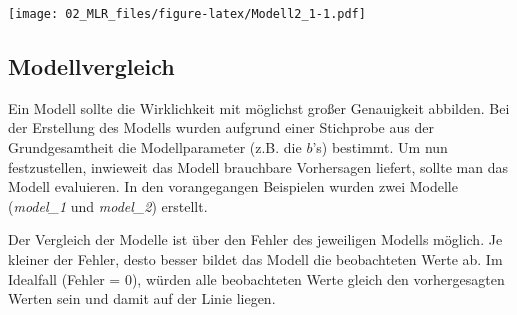 \documentclass[]{article}
\newenvironment{Shaded}{\begin{snugshade}}{\end{snugshade}}
\newcommand{\CommentTok}[1]{\textcolor[rgb]{0.56,0.35,0.01}{\textit{#1}}}
\newcommand{\DataTypeTok}[1]{\textcolor[rgb]{0.13,0.29,0.53}{#1}}
\newcommand{\DecValTok}[1]{\textcolor[rgb]{0.00,0.00,0.81}{#1}}
\newcommand{\KeywordTok}[1]{\textcolor[rgb]{0.13,0.29,0.53}{\textbf{#1}}}
\newcommand{\NormalTok}[1]{#1}
\newcommand{\OperatorTok}[1]{\textcolor[rgb]{0.81,0.36,0.00}{\textbf{#1}}}
\newcommand{\StringTok}[1]{\textcolor[rgb]{0.31,0.60,0.02}{#1}}
\begin{document}
\texttt{[image: 02\_MLR\_files/figure-latex/Modell2\_1-1.pdf]}

\hypertarget{modellvergleich}{%
\subsection*{Modellvergleich}\label{modellvergleich}}

Ein Modell sollte die Wirklichkeit mit möglichst großer Genauigkeit abbilden. Bei der Erstellung des Modells wurden aufgrund einer Stichprobe aus der Grundgesamtheit die Modellparameter (z.B. die \(b\)'s) bestimmt. Um nun festzustellen, inwieweit das Modell brauchbare Vorhersagen liefert, sollte man das Modell evaluieren. In den vorangegangen Beispielen wurden zwei Modelle (\emph{model\_1} und \emph{model\_2}) erstellt.

Der Vergleich der Modelle ist über den Fehler des jeweiligen Modells möglich. Je kleiner der Fehler, desto besser bildet das Modell die beobachteten Werte ab. Im Idealfall (Fehler = 0), würden alle beobachteten Werte gleich den vorhergesagten Werten sein und damit auf der Linie liegen.

\begin{Shaded}
\end{Shaded}
\end{document}

